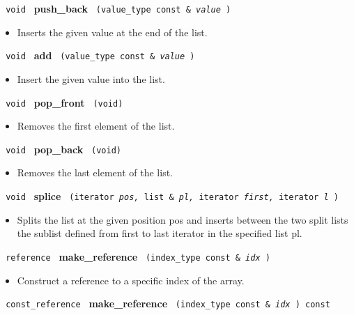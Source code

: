 \noindent
\texttt{%
void 	
}
\textbf{push\_back}%
\texttt{
(value\_type const \&
\textit{value}%
)
}

\begin{itemize}
\item
Inserts the given value at the end of the list.
\end{itemize}
 
\noindent
\texttt{%
void 	
}
\textbf{add}%
\texttt{
(value\_type const \&
\textit{value}%
)
}

\begin{itemize}
\item
Insert the given value into the list. 
\end{itemize}
 
\noindent
\texttt{%
void 	
}
\textbf{pop\_front}%
\texttt{
(void)
}
 	
\begin{itemize}
\item
Removes the first element of the list.
\end{itemize}
 
\noindent
\texttt{%
void 	
}
\textbf{pop\_back}%
\texttt{
(void)
}
 	
\begin{itemize}
\item
Removes the last element of the list.
\end{itemize}
 
\noindent
\texttt{%
void 	
}
\textbf{splice}%
\texttt{
(iterator 
\textit{pos,}%
list \&
\textit{pl,}%
iterator 
\textit{first,}%
iterator 
\textit{l}%
)
}
 	
\begin{itemize}
\item
Splits the list at the given position pos and inserts between the two split lists the sublist defined from first to last iterator in the specified list pl.
\end{itemize}

 
\noindent
\texttt{%
reference
}
\textbf{make\_reference}%
\texttt{%
(index\_type const \&
\textit{idx}%
)
}

\begin{itemize}
\item
Construct a reference to a specific index of the array.
\end{itemize}
 
\noindent
\texttt{%
const\_reference
}
\textbf{make\_reference}%
\texttt{%
(index\_type const \&
\textit{idx}%
) const
}


